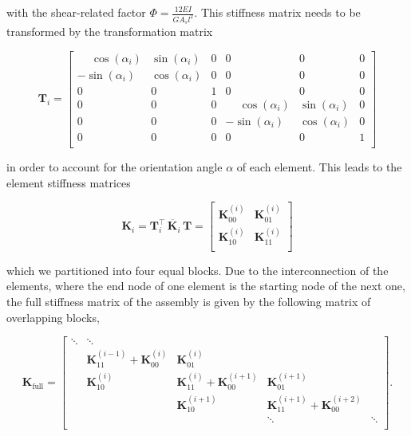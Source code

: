 with the shear-related factor $\Phi = \frac{12EI}{GA_s l^2}$.
This stiffness matrix needs to be transformed by the transformation matrix

\begin{equation}
\renewcommand\arraystretch{1.5}
\boldsymbol{T}_i = \begin{bmatrix}
\phantom{-}\cos(\alpha_i) & \sin(\alpha_i) & 0 & 0 & 0 & 0 \\
          -\sin(\alpha_i) & \cos(\alpha_i) & 0 & 0 & 0 & 0 \\
                      0 &            0 & 1 & 0 & 0 & 0 \\
0 & 0 & 0 & \phantom{-}\cos(\alpha_i) & \sin(\alpha_i) & 0 \\
0 & 0 & 0 &           -\sin(\alpha_i) & \cos(\alpha_i) & 0 \\
0 & 0 & 0 &                       0 &            0 & 1 \\
\end{bmatrix}
\end{equation}

in order to account for the orientation angle $\alpha$ of each element.
This leads to the element stiffness matrices

\begin{equation}
\renewcommand\arraystretch{1.5}
\boldsymbol{K}_{i} = \boldsymbol{T}_i^\intercal\,\overline{\boldsymbol{K}}_i\,\boldsymbol{T} =
\begin{bmatrix}
\boldsymbol{K}_{00}^{(i)} & \boldsymbol{K}_{01}^{(i)} \\
\boldsymbol{K}_{10}^{(i)} & \boldsymbol{K}_{11}^{(i)} \\
\end{bmatrix}
\end{equation}

which we partitioned into four equal blocks.
Due to the interconnection of the elements, where the end node of one element is the starting node of the next one, the full stiffness matrix of the assembly is given by the following matrix of overlapping blocks,

\begin{equation}
\renewcommand\arraystretch{1.5}
\boldsymbol{K}_{\mathrm{full}} = \begin{bmatrix}
\ddots & \ddots \\
& \boldsymbol{K}_{11}^{(i-1)} + \boldsymbol{K}_{00}^{(i)} & \boldsymbol{K}_{01}^{(i)} & \\
& \boldsymbol{K}_{10}^{(i)} & \boldsymbol{K}_{11}^{(i)} + \boldsymbol{K}_{00}^{(i+1)} & \boldsymbol{K}_{01}^{(i+1)} \\
&                           & \boldsymbol{K}_{10}^{(i+1)} & \boldsymbol{K}_{11}^{(i+1)} + \boldsymbol{K}_{00}^{(i+2)} \\
&                           &                             &                                          \ddots & \ddots \\
\end{bmatrix}.
\end{equation}

